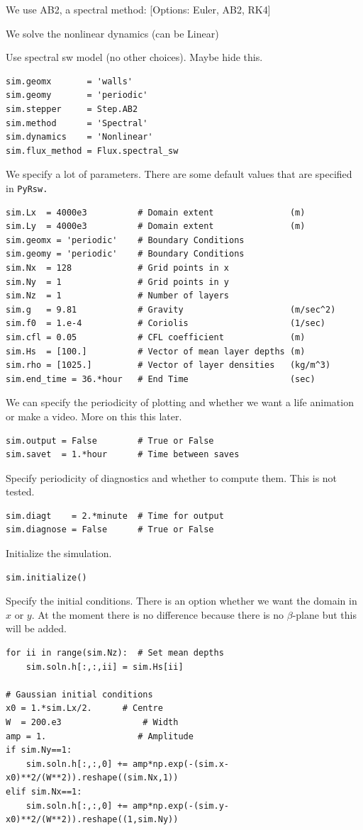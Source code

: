\documentclass[11pt]{article}
\begin{document}
\noindent We use AB2, a spectral method: [Options: Euler, AB2, RK4]

\noindent We solve the nonlinear dynamics (can be Linear) 

\noindent  Use spectral sw model (no other choices).  Maybe hide this.
\begin{lstlisting}
sim.geomx       = 'walls'            
sim.geomy       = 'periodic'
sim.stepper     = Step.AB2       
sim.method      = 'Spectral'       
sim.dynamics    = 'Nonlinear'    
sim.flux_method = Flux.spectral_sw
\end{lstlisting}

We specify a lot of parameters.  There are some default values that are specified in \tt{PyRsw}.
\begin{lstlisting}
sim.Lx  = 4000e3          # Domain extent               (m)
sim.Ly  = 4000e3          # Domain extent               (m)
sim.geomx = 'periodic'    # Boundary Conditions
sim.geomy = 'periodic'    # Boundary Conditions
sim.Nx  = 128             # Grid points in x
sim.Ny  = 1               # Grid points in y
sim.Nz  = 1               # Number of layers
sim.g   = 9.81            # Gravity                     (m/sec^2)
sim.f0  = 1.e-4           # Coriolis                    (1/sec)
sim.cfl = 0.05            # CFL coefficient             (m)
sim.Hs  = [100.]          # Vector of mean layer depths (m)
sim.rho = [1025.]         # Vector of layer densities   (kg/m^3)
sim.end_time = 36.*hour   # End Time                    (sec)
\end{lstlisting}

We can specify the periodicity of plotting and whether we want a life animation or make a video.  More on this this later.
\begin{lstlisting}
sim.output = False        # True or False
sim.savet  = 1.*hour      # Time between saves
\end{lstlisting}

Specify periodicity of diagnostics and whether to compute them.  This is not tested.
\begin{lstlisting}
sim.diagt    = 2.*minute  # Time for output
sim.diagnose = False      # True or False
\end{lstlisting}

Initialize the simulation.
\begin{lstlisting}
sim.initialize()
\end{lstlisting}

Specify the initial conditions.  There is an option whether we want the domain in $x$ or $y$.  At the moment there is no difference because there is no $\beta$-plane but this will be added.
\begin{lstlisting}
for ii in range(sim.Nz):  # Set mean depths
    sim.soln.h[:,:,ii] = sim.Hs[ii]

# Gaussian initial conditions
x0 = 1.*sim.Lx/2.      # Centre
W  = 200.e3                # Width
amp = 1.                  # Amplitude
if sim.Ny==1:
    sim.soln.h[:,:,0] += amp*np.exp(-(sim.x-x0)**2/(W**2)).reshape((sim.Nx,1))
elif sim.Nx==1:
    sim.soln.h[:,:,0] += amp*np.exp(-(sim.y-x0)**2/(W**2)).reshape((1,sim.Ny))
\end{lstlisting}
\end{document}
